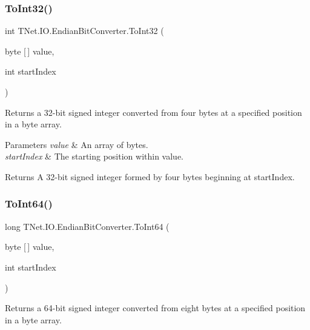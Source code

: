 \subsubsection{\texorpdfstring{To\+Int32()}{ToInt32()}}
{\footnotesize\ttfamily int T\+Net.\+I\+O.\+Endian\+Bit\+Converter.\+To\+Int32 (\begin{DoxyParamCaption}\item[{byte \mbox{[}$\,$\mbox{]}}]{value,  }\item[{int}]{start\+Index }\end{DoxyParamCaption})}



Returns a 32-\/bit signed integer converted from four bytes at a specified position in a byte array. 


\begin{DoxyParams}{Parameters}
{\em value} & An array of bytes.\\
\hline
{\em start\+Index} & The starting position within value.\\
\hline
\end{DoxyParams}
\begin{DoxyReturn}{Returns}
A 32-\/bit signed integer formed by four bytes beginning at start\+Index.
\end{DoxyReturn}
\mbox{\label{class_t_net_1_1_i_o_1_1_endian_bit_converter_aae5e69649f8d5240a1dd12bfc6da091c}} 
\subsubsection{\texorpdfstring{To\+Int64()}{ToInt64()}}
{\footnotesize\ttfamily long T\+Net.\+I\+O.\+Endian\+Bit\+Converter.\+To\+Int64 (\begin{DoxyParamCaption}\item[{byte \mbox{[}$\,$\mbox{]}}]{value,  }\item[{int}]{start\+Index }\end{DoxyParamCaption})}



Returns a 64-\/bit signed integer converted from eight bytes at a specified position in a byte array. 



